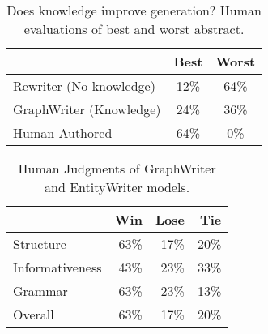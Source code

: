 \documentclass[11pt,a4paper]{article}
\begin{document}
\begin{table}
\begin{small}
\begin{center}
\begin{tabular}{lcc}
     & Best & Worst\\ \hline
    Rewriter (No knowledge) & 12\% & 64\%\\
    GraphWriter (Knowledge) & 24\% & 36\% \\
    Human Authored & 64\% & 0\% \\ \hline
\end{tabular}
\caption{Does knowledge improve generation? Human evaluations of best and worst abstract.}
\label{tab:know}
\end{center}
\end{small}
\end{table}
\begin{table}
\begin{small}
\begin{center}
\begin{tabular}{lrrr}
     & Win & Lose & Tie \\ \hline
    Structure  & 63\%  & 17\% & 20\%  \\
    Informativeness & 43\% & 23\% & 33\%   \\
    Grammar & 63\% & 23\% & 13\% \\ 
    Overall &  63\%  & 17\% & 20\% \\ \hline
\end{tabular}
\caption{Human Judgments of GraphWriter and EntityWriter models.}
\label{tab:VsEnt}
\end{center}
\end{small}
\end{table}
\end{document}
